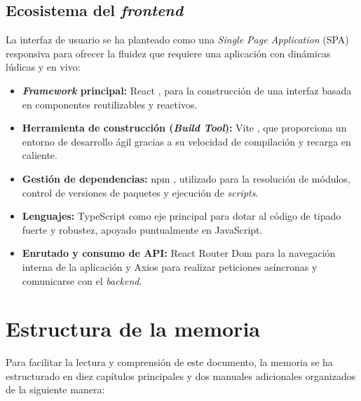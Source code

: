 \subsection{Ecosistema del \textit{frontend}}
La interfaz de usuario se ha planteado como una \textit{Single Page Application} (SPA) responsiva para ofrecer la fluidez que requiere una aplicación con dinámicas lúdicas y en vivo:
\begin{itemize}
    \item \textbf{\textit{Framework} principal:} React \cite{react_official}, para la construcción de una interfaz basada en componentes reutilizables y reactivos.
    \item \textbf{Herramienta de construcción (\textit{Build Tool}):} Vite \cite{vite_official}, que proporciona un entorno de desarrollo ágil gracias a su velocidad de compilación y recarga en caliente.
    \item \textbf{Gestión de dependencias:} npm \cite{npm_official}, utilizado para la resolución de módulos, control de versiones de paquetes y ejecución de \textit{scripts}.
    \item \textbf{Lenguajes:} TypeScript \cite{typescript_official} como eje principal para dotar al código de tipado fuerte y robustez, apoyado puntualmente en JavaScript.
    \item \textbf{Enrutado y consumo de API:} React Router Dom \cite{react_router_official} para la navegación interna de la aplicación y Axios \cite{axios_official} para realizar peticiones asíncronas y comunicarse con el \textit{backend}.
\end{itemize}

\section{Estructura de la memoria}\label{sec:estructura_de_la_memoria}

Para facilitar la lectura y comprensión de este documento, la memoria se ha estructurado en diez capítulos principales y dos manuales adicionales organizados de la siguiente manera:

